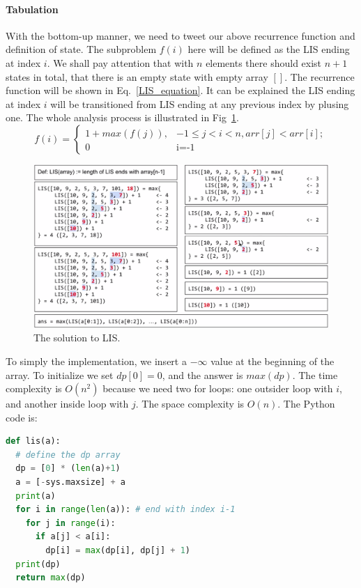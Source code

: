 \documentclass[../main.tex]{subfiles}
\begin{document}
\paragraph{Tabulation}  With the bottom-up manner, we need to tweet our above recurrence function and definition of state. The subproblem $f(i)$ here will be defined as the LIS ending at index $i$. We shall pay attention that with $n$ elements there should exist $n+1$ states in total, that there is an empty state with empty array $[]$. The recurrence function will be shown in Eq.~\ref{LIS_equation}. It can be explained the LIS ending at index $i$ will be transitioned from LIS ending at any previous index by plusing one.  The whole analysis process is illustrated in Fig~\ref{fig:lis}.    
\begin{equation}
\label{LIS_equation}
    f(i) = \begin{cases}
    1 + max(f(j)),& -1\leq j<i < n, arr[j] < arr[i];\\
    0& \text{i=-1}
    \end{cases}
\end{equation}
\begin{figure}[!ht]
    \centering
    \includegraphics[width=0.8\columnwidth]{fig/LIS.png}
    \caption{The solution to LIS. }
    \label{fig:lis}
\end{figure}
To simply the implementation, we insert a $-\infty$ value at the beginning of the array. To initialize we set $dp[0] = 0$, and the answer is $max(dp)$.  The time complexity is $O(n^2)$ because we need two for loops: one outsider loop with $i$, and another inside loop with $j$. The space complexity is $O(n)$. The Python code is:
\begin{lstlisting}[language= Python]
def lis(a):
  # define the dp array
  dp = [0] * (len(a)+1)
  a = [-sys.maxsize] + a
  print(a)
  for i in range(len(a)): # end with index i-1
    for j in range(i):
      if a[j] < a[i]:
        dp[i] = max(dp[i], dp[j] + 1)
  print(dp)
  return max(dp)
\end{lstlisting}
\end{document}
